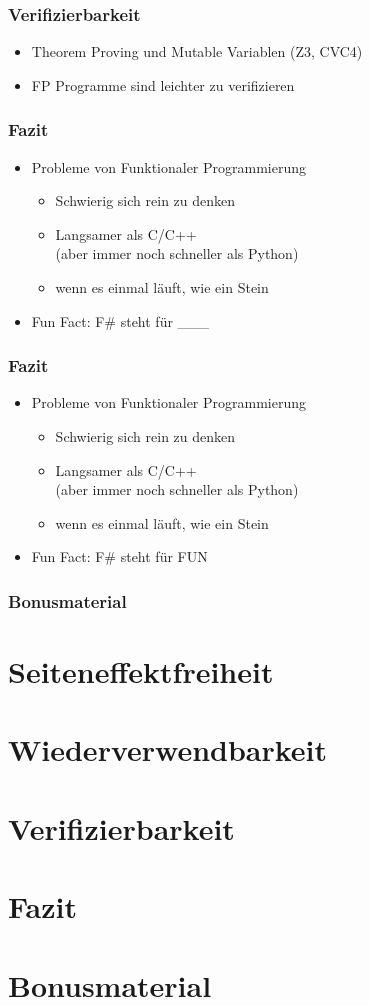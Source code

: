 \documentclass{beamer}
\begin{document}
\begin{frame}
    \frametitle{Verifizierbarkeit}
    \begin{itemize}
        \item Theorem Proving und Mutable Variablen (Z3, CVC4)
        \item FP Programme sind leichter zu verifizieren
    \end{itemize}
\end{frame}

\begin{frame}
    \frametitle{Fazit}
    \begin{itemize}
        \item Probleme von Funktionaler Programmierung
        \begin{itemize}
            \item Schwierig sich rein zu denken
            \item Langsamer als C/C++ \\
            {\footnotesize(aber immer noch schneller als Python)}
            \item wenn es einmal läuft, wie ein Stein
        \end{itemize}
        \item Fun Fact: F\# steht für \_\_\_
    \end{itemize}
\end{frame}


\begin{frame}
    \frametitle{Fazit}
    \begin{itemize}
        \item Probleme von Funktionaler Programmierung
        \begin{itemize}
            \item Schwierig sich rein zu denken
            \item Langsamer als C/C++ \\
            {\footnotesize(aber immer noch schneller als Python)}
            \item wenn es einmal läuft, wie ein Stein
        \end{itemize}
        \item Fun Fact: F\# steht für FUN
    \end{itemize}
\end{frame}

\begin{frame}
    \frametitle{Bonusmaterial}
\end{frame}

\section{Seiteneffektfreiheit}
\section{Wiederverwendbarkeit}
\section{Verifizierbarkeit}
\section{Fazit}
\section{Bonusmaterial}
\end{document}
